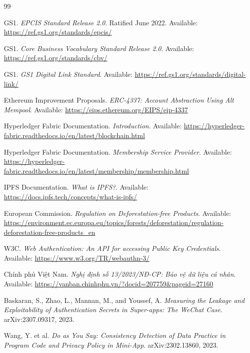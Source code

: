 \documentclass[12pt,a4paper]{article}
\begin{document}
\newpage
\begin{thebibliography}{99}

GS1. \textit{EPCIS Standard Release 2.0}. Ratified June 2022. Available: \url{https://ref.gs1.org/standards/epcis/}

GS1. \textit{Core Business Vocabulary Standard Release 2.0}. Available: \url{https://ref.gs1.org/standards/cbv/}

GS1. \textit{GS1 Digital Link Standard}. Available: \url{https://ref.gs1.org/standards/digital-link/}

Ethereum Improvement Proposals. \textit{ERC-4337: Account Abstraction Using Alt Mempool}. Available: \url{https://eips.ethereum.org/EIPS/eip-4337}

Hyperledger Fabric Documentation. \textit{Introduction}. Available: \url{https://hyperledger-fabric.readthedocs.io/en/latest/blockchain.html}

Hyperledger Fabric Documentation. \textit{Membership Service Provider}. Available: \url{https://hyperledger-fabric.readthedocs.io/en/latest/membership/membership.html}

IPFS Documentation. \textit{What is IPFS?}. Available: \url{https://docs.ipfs.tech/concepts/what-is-ipfs/}

European Commission. \textit{Regulation on Deforestation-free Products}. Available: \url{https://environment.ec.europa.eu/topics/forests/deforestation/regulation-deforestation-free-products_en}

W3C. \textit{Web Authentication: An API for accessing Public Key Credentials}. Available: \url{https://www.w3.org/TR/webauthn-3/}

Chính phủ Việt Nam. \textit{Nghị định số 13/2023/NĐ-CP: Bảo vệ dữ liệu cá nhân}. Available: \url{https://vanban.chinhphu.vn/?docid=207759&pageid=27160}

Baskaran, S., Zhao, L., Mannan, M., and Youssef, A. \textit{Measuring the Leakage and Exploitability of Authentication Secrets in Super-apps: The WeChat Case}. arXiv:2307.09317, 2023.

Wang, Y. et al. \textit{Do as You Say: Consistency Detection of Data Practice in Program Code and Privacy Policy in Mini-App}. arXiv:2302.13860, 2023.

\end{thebibliography}
\end{document}
